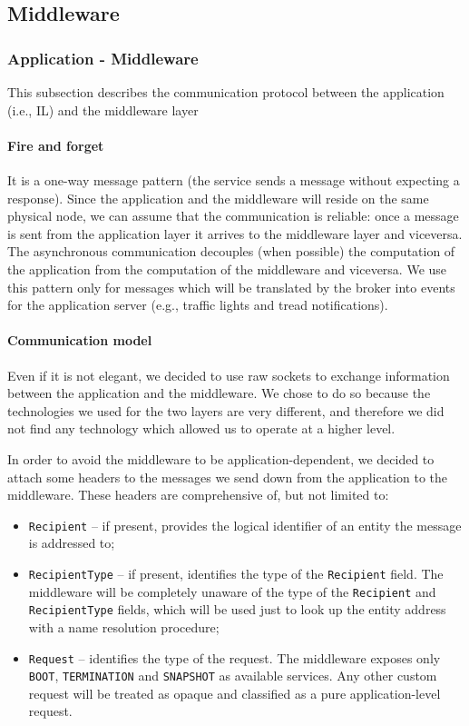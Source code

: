 \subsection{Middleware}
\subsubsection{Application - Middleware}
This subsection describes the communication protocol between
the application (i.e., IL) and the middleware layer
\paragraph{Fire and forget}
It is a one-way message pattern (the service sends a message without expecting
a response). Since the application and the middleware will reside on the same
physical node, we can assume that the communication is reliable: once a message
is sent from the application layer it arrives to the middleware layer and
viceversa. The asynchronous communication decouples (when possible)
the computation of the application from the computation of the middleware
and viceversa. We use this pattern only for messages which will be
translated by the broker into events for the application server
(e.g., traffic lights and tread
notifications).

\paragraph{Communication model}
Even if it is not elegant, we decided to use raw sockets to exchange
information between the application and the middleware.
We chose to do so because the technologies we used for the two layers are very
different, and therefore we did not find any technology which allowed us to
operate at a higher level.

In order to avoid the middleware to be application-dependent, we decided to
attach some headers to the messages we send down from the application to the
middleware.
These headers are comprehensive of, but not limited to:
\begin{itemize}
  \item \texttt{Recipient} -- if present, provides the logical identifier of an
    entity the message is addressed to;
  \item \texttt{RecipientType} -- if present, identifies the type of the
    \texttt{Recipient} field. The middleware will be completely unaware
    of the type of the \texttt{Recipient} and \texttt{RecipientType} fields,
    which will be used just to look up the entity address with a name
    resolution procedure;
  \item \texttt{Request} -- identifies the type of the request. The middleware
    exposes only \texttt{BOOT}, \texttt{TERMINATION} and \texttt{SNAPSHOT} as
    available services. Any other custom request will be treated as opaque and
    classified as a pure application-level request.
\end{itemize}


